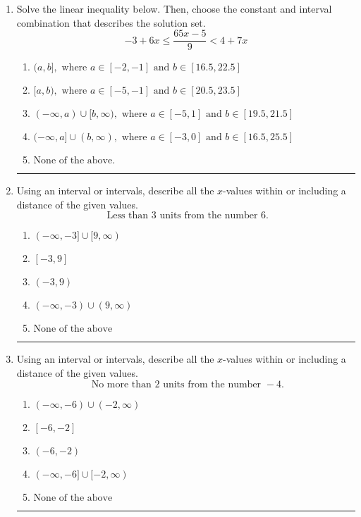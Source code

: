 \documentclass[14pt]{extbook}
\newcommand{\litem}[1]{\item#1\hspace*{-1cm}\rule{\textwidth}{0.4pt}}
\begin{document}
\begin{enumerate}
{\begin{enumerate}[label=\Alph*.]
\end{enumerate} }
\litem{
Solve the linear inequality below. Then, choose the constant and interval combination that describes the solution set.\[ -3 + 6 x \leq \frac{65 x - 5}{9} < 4 + 7 x \]\begin{enumerate}[label=\Alph*.]
\item \( (a, b], \text{ where } a \in [-2, -1] \text{ and } b \in [16.5, 22.5] \)
\item \( [a, b), \text{ where } a \in [-5, -1] \text{ and } b \in [20.5, 23.5] \)
\item \( (-\infty, a) \cup [b, \infty), \text{ where } a \in [-5, 1] \text{ and } b \in [19.5, 21.5] \)
\item \( (-\infty, a] \cup (b, \infty), \text{ where } a \in [-3, 0] \text{ and } b \in [16.5, 25.5] \)
\item \( \text{None of the above.} \)

\end{enumerate} }
\litem{
Using an interval or intervals, describe all the $x$-values within or including a distance of the given values.\[ \text{ Less than } 3 \text{ units from the number } 6. \]\begin{enumerate}[label=\Alph*.]
\item \( (-\infty, -3] \cup [9, \infty) \)
\item \( [-3, 9] \)
\item \( (-3, 9) \)
\item \( (-\infty, -3) \cup (9, \infty) \)
\item \( \text{None of the above} \)

\end{enumerate} }
\litem{
Using an interval or intervals, describe all the $x$-values within or including a distance of the given values.\[ \text{ No more than } 2 \text{ units from the number } -4. \]\begin{enumerate}[label=\Alph*.]
\item \( (-\infty, -6) \cup (-2, \infty) \)
\item \( [-6, -2] \)
\item \( (-6, -2) \)
\item \( (-\infty, -6] \cup [-2, \infty) \)
\item \( \text{None of the above} \)


\end{enumerate}}
\end{enumerate}
\end{document}
